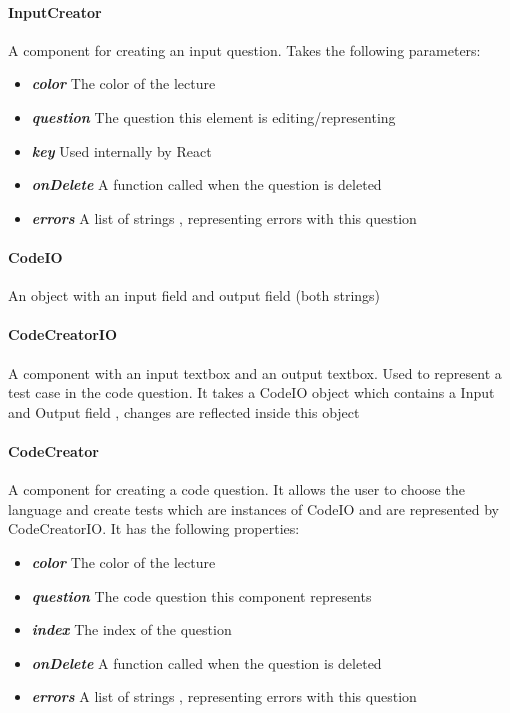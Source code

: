 \paragraph{InputCreator} A component for creating an input question. Takes the following parameters:
\begin{itemize}
	\item \textit{\textbf{color}} The color of the lecture
	\item \textit{\textbf{question}} The question this element is editing/representing
	\item \textit{\textbf{key}} Used internally by React
	\item \textit{\textbf{onDelete}} A function called when the question is deleted
	\item \textit{\textbf{errors}} A list of strings , representing errors with this question
\end{itemize}
\paragraph{CodeIO} An object with an input field and output field (both strings)
\paragraph{CodeCreatorIO} A component with an input textbox and an output textbox. Used to represent a test case in the code question. It takes a CodeIO object which contains a Input and Output field , changes are reflected inside this object
\paragraph{CodeCreator} A component for creating a code question. It allows the user to choose the language and create tests which are instances of CodeIO and are represented by CodeCreatorIO. It has the following properties:
\begin{itemize}
	\item \textit{\textbf{color}} The color of the lecture
	\item \textit{\textbf{question}} The code question this component represents
	\item \textit{\textbf{index}} The index of the question
	\item \textit{\textbf{onDelete}} A function called when the question is deleted
	\item \textit{\textbf{errors}} A list of strings , representing errors with this question
\end{itemize}
